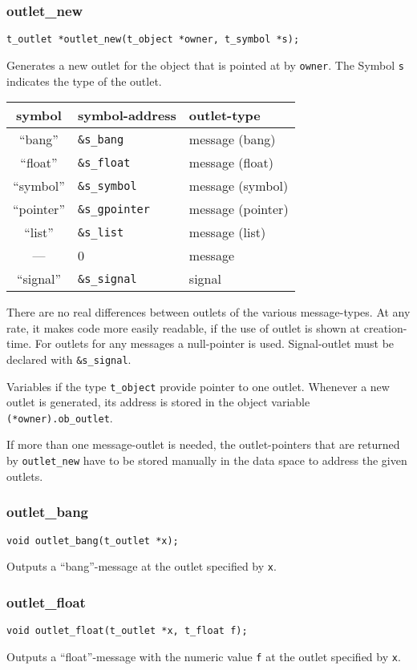 \documentclass[12pt, a4paper,english,titlepage]{article}
\begin{document}
\begin{appendix}
\subsubsection{outlet\_new}
\begin{verbatim}
t_outlet *outlet_new(t_object *owner, t_symbol *s);
\end{verbatim}
Generates a new outlet for the object that is pointed at by \verb+owner+.
The Symbol \verb+s+ indicates the type of the outlet.

\begin{tabular}{c|l||l}
symbol & symbol-address & outlet-type \\
\hline\hline
``bang'' & \verb+&s_bang+ & message (bang)\\
``float'' & \verb+&s_float+ & message (float)\\
``symbol'' & \verb+&s_symbol+ & message (symbol) \\
``pointer'' & \verb+&s_gpointer+ & message (pointer)\\
``list'' & \verb+&s_list+ & message (list) \\
--- & 0 & message \\
\hline
``signal'' & \verb+&s_signal+ & signal \\
\end{tabular}

There are no real differences between outlets of the various message-types.
At any rate, it makes code more easily readable,
if the use of outlet is shown at creation-time.
For outlets for any messages a null-pointer is used.
Signal-outlet must be declared with \verb+&s_signal+.

Variables if the type \verb+t_object+ provide pointer to one outlet.
Whenever a new outlet is generated, its address is stored in the
object variable \verb+(*owner).ob_outlet+.

If more than one message-outlet is needed,
the outlet-pointers that are returned by \verb+outlet_new+ 
have to be stored manually in the data space
to address the given outlets.

\subsubsection{outlet\_bang}
\begin{verbatim}
void outlet_bang(t_outlet *x);
\end{verbatim}
Outputs a ``bang''-message at the outlet specified by \verb+x+.

\subsubsection{outlet\_float}
\begin{verbatim}
void outlet_float(t_outlet *x, t_float f);
\end{verbatim}
Outputs a ``float''-message with the numeric value \verb+f+
at the outlet specified by \verb+x+.


\end{appendix}
\end{document}
